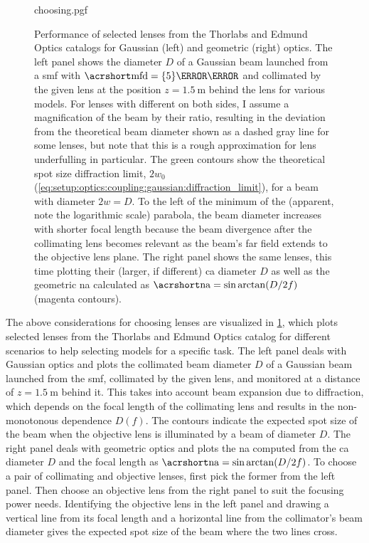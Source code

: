 \begin{figure}
    \centering
    {\begingroup
        \hypersetup{hidelinks}
        {choosing.pgf}
    \endgroup}
    \caption[]{
        Performance of selected lenses from the Thorlabs and Edmund Optics catalogs for Gaussian (left) and geometric (right) optics.
        The left panel shows the diameter $D$ of a Gaussian beam launched from a \gls{smf} with $\MFD = \qty{5}{\micro\meter}$ and collimated by the given lens at the position $z = \qty{1.5}{\meter}$ behind the lens for various models.
        For lenses with different  on both sides, I assume a magnification of the beam by their ratio, resulting in the deviation from the theoretical beam diameter shown as a dashed gray line for some lenses, but note that this is a rough approximation for lens underfulling in particular.
        The green contours show the theoretical spot size diffraction limit, $2w_0$ (\cref{eq:setup:optics:coupling:gaussian:diffraction_limit}), for a beam with diameter $2w=D$.
        To the left of the minimum of the (apparent, note the logarithmic scale) parabola, the beam diameter increases with shorter focal length because the beam divergence after the collimating lens becomes relevant as the beam's far field extends to the objective lens plane.
        The right panel shows the same lenses, this time plotting their (larger, if different) \gls{ca} diameter $D$ as well as the geometric \gls{na} calculated as $\NA = \sin\arctan(D/2f)$ (magenta contours).
    }
    \label{fig:setup:optics:coupling:lenses}
\end{figure}

The above considerations for choosing lenses are visualized in \cref{fig:setup:optics:coupling:lenses}, which plots selected lenses from the Thorlabs and Edmund Optics catalog for different scenarios to help selecting models for a specific task.
The left panel deals with Gaussian optics and plots the collimated beam diameter $D$ of a Gaussian beam launched from the \gls{smf}, collimated by the given lens, and monitored at a distance of $z=\qty{1.5}{\meter}$ behind it.
This takes into account beam expansion due to diffraction, which depends on the focal length of the collimating lens and results in the non-monotonous dependence $D(f)$.
The contours indicate the expected spot size of the beam when the objective lens is illuminated by a beam of diameter $D$.
The right panel deals with geometric optics and plots the \gls{na} computed from the \gls{ca} diameter $D$ and the focal length as $\NA = \sin\arctan(D/2f)$.
To choose a pair of collimating and objective lenses, first pick the former from the left panel.
Then choose an objective lens from the right panel to suit the focusing power needs.
Identifying the objective lens in the left panel and drawing a vertical line from its focal length and a horizontal line from the collimator's beam diameter gives the expected spot size of the beam where the two lines cross.

